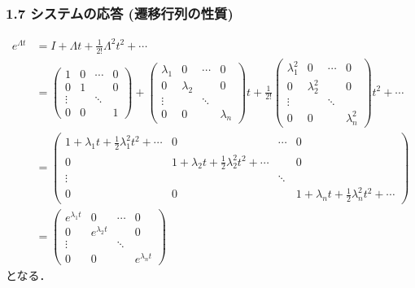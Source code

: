 \begin{frame}[t]
\frametitle{1.7 システムの応答 (遷移行列の性質)}
\vspace*{-0.7cm}

{\small
\begin{align}
 e^{\Lambda t}
 &= I + \Lambda t + \frac{1}{2!}\Lambda^2t^2 + \cdots \nonumber\\
 &=
 \left(\begin{array}{cccc}
        1      & 0 & \cdots & 0 \\
  0      & 1 &        & 0 \\
  \vdots &   & \ddots &   \\
  0      & 0 &        & 1
       \end{array}\right) +
 \left(\begin{array}{cccc}
        \lambda_1 & 0         & \cdots & 0 \\
  0         & \lambda_2 &        & 0 \\
  \vdots    &           & \ddots &   \\
  0         & 0         &        & \lambda_n
       \end{array}\right) t +
 \frac{1}{2!}
 \left(\begin{array}{cccc}
        \lambda_1^2 & 0         & \cdots & 0 \\
  0         & \lambda_2^2 &        & 0 \\
  \vdots    &           & \ddots &   \\
  0         & 0         &        & \lambda_n^2
       \end{array}\right) t^2 + \cdots \nonumber\\
 &=
 \left(\begin{array}{cccc}
        1 + \lambda_1 t + \frac{1}{2} \lambda_1^2 t^2 + \cdots & 0 & \cdots & 0 \\
  0      & 1 + \lambda_2 t + \frac{1}{2} \lambda_2^2 t^2 + \cdots &        & 0 \\
  \vdots &   & \ddots &   \\
  0      & 0 &        & 1 + \lambda_n t + \frac{1}{2} \lambda_n^2 t^2 + \cdots
       \end{array}\right)
\nonumber\\
 &=
 \left(\begin{array}{cccc}
        e^{\lambda_1 t} & 0               & \cdots & 0 \\
  0               & e^{\lambda_2 t} &        & 0 \\
  \vdots          &                 & \ddots & \\
  0               & 0               &        & e^{\lambda_n t}
       \end{array}\right)
 \label{e_diag}
\end{align}
}
となる．
\end{frame}


